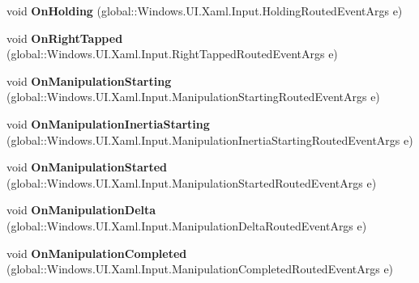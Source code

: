 \begin{DoxyCompactItemize}
void {\bfseries On\+Holding} (global\+::\+Windows.\+U\+I.\+Xaml.\+Input.\+Holding\+Routed\+Event\+Args e)
\item 
\mbox{\label{interface_windows_1_1_u_i_1_1_xaml_1_1_controls_1_1_i_control_overrides_a5fbc80a16d3e6c89a86a5b99d3cca69f}} 
void {\bfseries On\+Right\+Tapped} (global\+::\+Windows.\+U\+I.\+Xaml.\+Input.\+Right\+Tapped\+Routed\+Event\+Args e)
\item 
\mbox{\label{interface_windows_1_1_u_i_1_1_xaml_1_1_controls_1_1_i_control_overrides_aa77c2f27ff19f19ddb9d11c56eb88ecf}} 
void {\bfseries On\+Manipulation\+Starting} (global\+::\+Windows.\+U\+I.\+Xaml.\+Input.\+Manipulation\+Starting\+Routed\+Event\+Args e)
\item 
\mbox{\label{interface_windows_1_1_u_i_1_1_xaml_1_1_controls_1_1_i_control_overrides_a21b1d1b2b1ecdec91300370cf68756eb}} 
void {\bfseries On\+Manipulation\+Inertia\+Starting} (global\+::\+Windows.\+U\+I.\+Xaml.\+Input.\+Manipulation\+Inertia\+Starting\+Routed\+Event\+Args e)
\item 
\mbox{\label{interface_windows_1_1_u_i_1_1_xaml_1_1_controls_1_1_i_control_overrides_ac3442eba714609f27fe4dd677f6f69cf}} 
void {\bfseries On\+Manipulation\+Started} (global\+::\+Windows.\+U\+I.\+Xaml.\+Input.\+Manipulation\+Started\+Routed\+Event\+Args e)
\item 
\mbox{\label{interface_windows_1_1_u_i_1_1_xaml_1_1_controls_1_1_i_control_overrides_a34e586f6a14135e204c81f1e9f6b5e18}} 
void {\bfseries On\+Manipulation\+Delta} (global\+::\+Windows.\+U\+I.\+Xaml.\+Input.\+Manipulation\+Delta\+Routed\+Event\+Args e)
\item 
\mbox{\label{interface_windows_1_1_u_i_1_1_xaml_1_1_controls_1_1_i_control_overrides_ab30d6aba08b80481dbb976080452f0f8}} 
void {\bfseries On\+Manipulation\+Completed} (global\+::\+Windows.\+U\+I.\+Xaml.\+Input.\+Manipulation\+Completed\+Routed\+Event\+Args e)

\end{DoxyCompactItemize}
